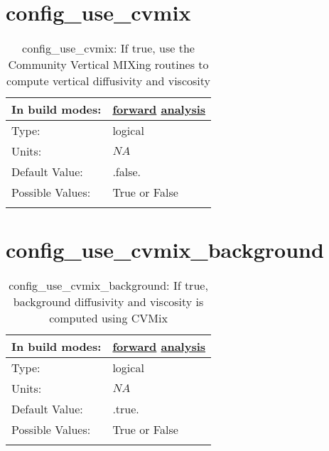 \section[config\_use\_cvmix]{config\_use\_cvmix}
\label{sec:nm_sec_config_use_cvmix}
\begin{center}
\begin{longtable}{| p{2.0in} || p{4.0in} |}
    \hline
    In build modes: & \hyperref[subsec:forward_nm_tab_cvmix]{forward} \hyperref[subsec:analysis_nm_tab_cvmix]{analysis} \\
    \hline
    Type: & logical \\
    \hline
    Units: & $NA$ \\
    \hline
    Default Value: & .false. \\
    \hline
    Possible Values: & True or False \\
    \hline
    \caption{config\_use\_cvmix: If true, use the Community Vertical MIXing routines to compute vertical diffusivity and viscosity}
\end{longtable}
\end{center}
\section[config\_use\_cvmix\_background]{config\_use\_cvmix\_background}
\label{sec:nm_sec_config_use_cvmix_background}
\begin{center}
\begin{longtable}{| p{2.0in} || p{4.0in} |}
    \hline
    In build modes: & \hyperref[subsec:forward_nm_tab_cvmix]{forward} \hyperref[subsec:analysis_nm_tab_cvmix]{analysis} \\
    \hline
    Type: & logical \\
    \hline
    Units: & $NA$ \\
    \hline
    Default Value: & .true. \\
    \hline
    Possible Values: & True or False \\
    \hline
    \caption{config\_use\_cvmix\_background: If true, background diffusivity and viscosity is computed using CVMix}
\end{longtable}
\end{center}
